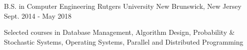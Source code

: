 \begin{cventries}
  \cventry
    {B.S. in Computer Engineering}
    {Rutgers University}
    {New Brunswick, New Jersey}
    {Sept. 2014 - May 2018}
    {
      \begin{cvitems}
        \item {Selected courses in Database Management, Algorithm Design, Probability \& Stochastic Systems, Operating Systems,
         Parallel and Distributed Programming}
      \end{cvitems}
    }
\end{cventries}
